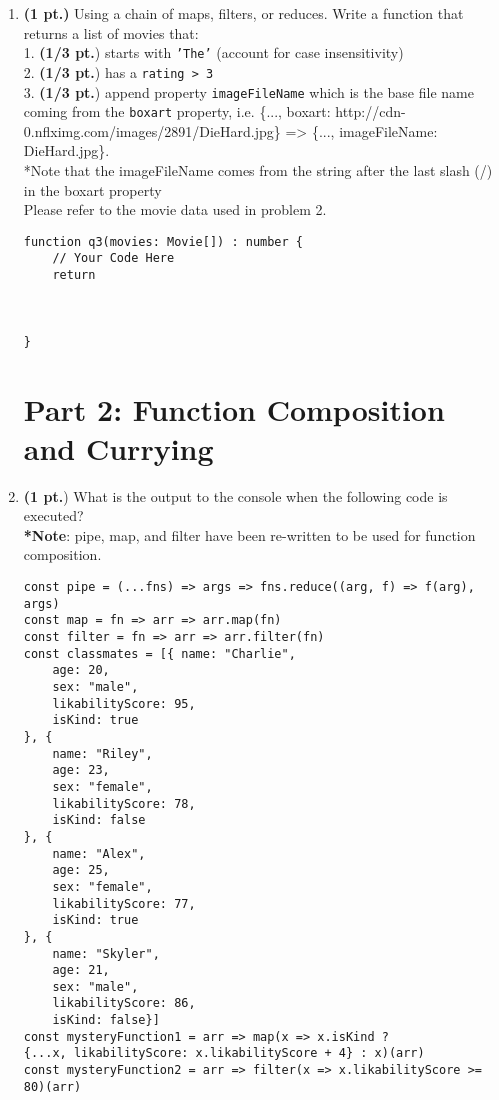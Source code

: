 \documentclass[12pt]{article}
\begin{document}
\begin{enumerate}
\newpage
\item \textbf{(1 pt.)} Using a chain of maps, filters, or reduces. Write a function that returns a list of movies that: \\
  1. \textbf{(1/3 pt.}) starts with \texttt{'The'} (account for case insensitivity) \\
  2. \textbf{(1/3 pt.}) has a \texttt{rating > 3} \\
  3. \textbf{(1/3 pt.}) append property \texttt{imageFileName} which is the base file name coming from the \texttt{boxart} property, i.e. \{..., boxart: http://cdn-0.nflximg.com/images/2891/DieHard.jpg\} => \{..., imageFileName: DieHard.jpg\}. \\
  *Note that the imageFileName comes from the string after the last slash (/) in the boxart property \\
  
  Please refer to the movie data used in problem 2.

\begin{lstlisting}[style=JavaScript]
function q3(movies: Movie[]) : number {
    // Your Code Here
    return 
    
    
    
}
\end{lstlisting}


\newpage
\section{Part 2: Function Composition and Currying}

\item \textbf{(1 pt.}) What is the output to the console when the following code is executed? \\ \textbf{*Note}: pipe, map, and filter have been re-written to be used for function composition.
\begin{lstlisting}[style=JavaScript]
const pipe = (...fns) => args => fns.reduce((arg, f) => f(arg), args)
const map = fn => arr => arr.map(fn)
const filter = fn => arr => arr.filter(fn)
const classmates = [{ name: "Charlie",
    age: 20,
    sex: "male",
    likabilityScore: 95,
    isKind: true
}, {
    name: "Riley",
    age: 23,
    sex: "female",
    likabilityScore: 78,
    isKind: false
}, {
    name: "Alex",
    age: 25,
    sex: "female",
    likabilityScore: 77,
    isKind: true
}, {
    name: "Skyler",
    age: 21,
    sex: "male",
    likabilityScore: 86,
    isKind: false}]
const mysteryFunction1 = arr => map(x => x.isKind ? 
{...x, likabilityScore: x.likabilityScore + 4} : x)(arr)
const mysteryFunction2 = arr => filter(x => x.likabilityScore >= 80)(arr)


\end{lstlisting}
\end{enumerate}
\end{document}
